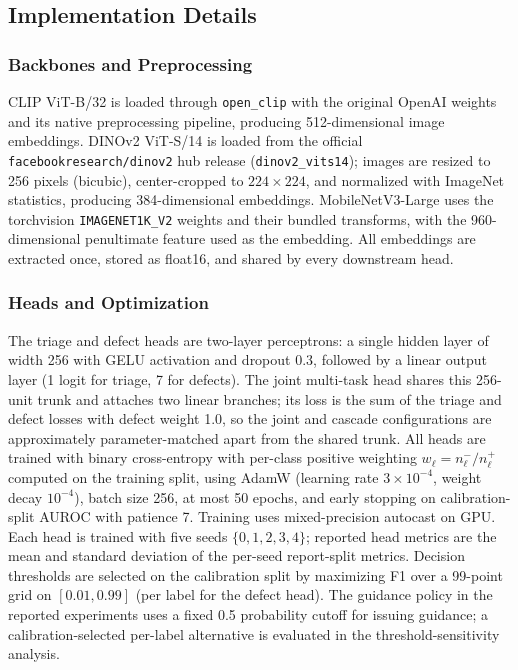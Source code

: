 \documentclass{ieeeaccess}
\newcommand{\clip}{CLIP}
\newcommand{\dinov}{DINOv2}
\newcommand{\mobilenet}{MobileNetV3}
\begin{document}
\subsection{Implementation Details}
\label{sec:implementation}

\subsubsection{Backbones and Preprocessing}
\clip{} ViT-B/32 is loaded through \texttt{open\_clip} with the
original OpenAI weights and its native preprocessing pipeline,
producing 512-dimensional image embeddings. \dinov{} ViT-S/14 is
loaded from the official \texttt{facebookresearch/dinov2} hub
release (\texttt{dinov2\_vits14}); images are resized to 256
pixels (bicubic), center-cropped to $224\times224$, and
normalized with ImageNet statistics, producing 384-dimensional
embeddings. \mobilenet{}-Large uses the torchvision
\texttt{IMAGENET1K\_V2} weights and their bundled transforms,
with the 960-dimensional penultimate feature used as the
embedding. All embeddings are extracted once, stored as
float16, and shared by every downstream head.

\subsubsection{Heads and Optimization}
The triage and defect heads are two-layer perceptrons: a single
hidden layer of width 256 with GELU activation and dropout 0.3,
followed by a linear output layer (1 logit for triage, 7 for
defects). The joint multi-task head shares this 256-unit trunk
and attaches two linear branches; its loss is the sum of the
triage and defect losses with defect weight 1.0, so the joint
and cascade configurations are approximately parameter-matched
apart from the shared trunk. All heads are trained with
binary cross-entropy with per-class positive weighting
$w_{\ell} = n^{-}_{\ell}/n^{+}_{\ell}$ computed on the training
split, using AdamW (learning rate $3\times10^{-4}$, weight decay
$10^{-4}$), batch size 256, at most 50 epochs, and early stopping
on calibration-split AUROC with patience 7. Training uses
mixed-precision autocast on GPU. Each head is trained with five
seeds $\{0,1,2,3,4\}$; reported head metrics are the mean and
standard deviation of the per-seed report-split metrics.
Decision thresholds are selected on the calibration split by
maximizing F1 over a 99-point grid on $[0.01,0.99]$ (per label
for the defect head). The guidance policy in the reported
experiments uses a fixed 0.5 probability cutoff for issuing
guidance; a calibration-selected per-label alternative is
evaluated in the threshold-sensitivity analysis.
\end{document}
